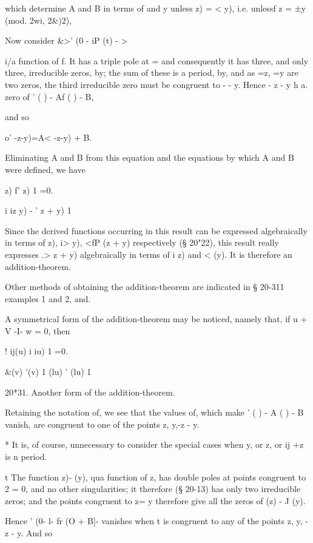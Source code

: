 {which determine A and B in terms of and y unless z) = < y), i.e.
unlessf z = ±y (mod. 2wi, 2\&)2),

Now consider \&>' (0 - iP (t) - >

 i/a function of f. It has a triple pole at = and consequently it has
three, and only three, irreducible zeros, by; the sum of these
is a period, by, and as =z, =y are two zeros, the third
irreducible zero must be congruent to - - y. Hence - z - y h a. zero
of ' ( ) - Af ( ) - B,

and so

 o' -z-y)=A< -z-y) + B.

Eliminating A and B from this equation and the equations by which A
and B were defined, we have

  z) f' z) 1 =0.

i iz y) - ' z + y) 1

Since the derived functions occurring in this result can be expressed
algebraically in terms of z), i> y), <fP (z + y) respectively (§
20"22), this result really expresses .> z + y) algebraically in terms
of i z) and < (y). It is therefore an addition-theorem.

Other methods of obtaining the addition-theorem are indicated in §
20-311 examples 1 and 2, and.

A symmetrical form of the addition-theorem may be noticed, namely
that, if u + V -I- w = 0, then

! ij(u) i iu) 1 =0.

\&(v) '(v) 1 (lu) ' (lu) 1

20*31. Another form of the addition-theorem.

Retaining the notation of, we see that the values of, which
make ' ( ) - A ( ) - B vanish, are congruent to one of the points z,
y,-z - y.

* It is, of course, unnecessary to consider the special cases when y,
or z, or ij +z is n period.

t The function z)- (y), qua function of z, has double poles at points
congruent to 2 = 0, and no other singularities; it therefore (§
20-13) has only two irreducible zeros; and the points congruent to z=
y therefore give all the zeros of (z) - J (y).

%
%

Hence ' (0- l- fr (O + B]- vanishes when t is congruent to any of the
points z, y, - z - y. And so

}
